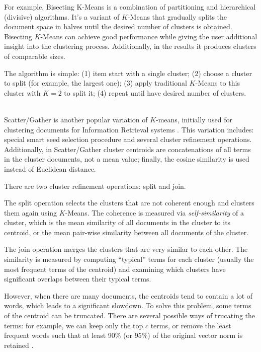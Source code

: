 For example, Bisecting K-Means \cite{steinbach2000comparison} is a combination
of partitioning and hierarchical (divisive) algorithms. It's a 
variant of $K$-Means that gradually splits the document space in halves 
until the desired number of clusters is obtained. Bisecting $K$-Means can 
achieve good performance while giving the user additional insight into 
the clustering process. Additionally, in the results it produces 
clusters of comparable sizes. 

The algorithm is simple: (1) item start with a single cluster;
(2) choose a cluster to split (for example, the largest one);
(3) apply traditional $K$-Means to this cluster with $K=2$ to split it;
(4) repeat until have desired number of clusters.

\ \\

Scatter/Gather is another popular variation of $K$-means, initially used for 
clustering documents for Information Retrieval systems \cite{cutting1992scatter}. 
This variation includes: special smart seed selection procedure and
several cluster refinement operations. Additionally, in Scatter/Gather 
cluster centroids are concatenations of all terms in the cluster documents, 
not a mean value; finally, the cosine similarity is used instead of Euclidean
distance.

There are two cluster refinement operations: split and join.

The split operation selects the clusters that are not coherent
enough and clusters them again using $K$-Means. The coherence is 
measured via \emph{self-similarity} of a cluster,
which is the mean similarity of all documents in the cluster to
its centroid, or the mean pair-wise similarity between all documents
of the cluster.

The join operation merges the clusters that are very similar
to each other. The similarity is measured by computing ``typical''
terms for each cluster (usually the most frequent terms of
the centroid) and examining which clusters have significant
overlaps between their typical terms.


However, when there are many documents, the centroids tend
to contain a lot of words, which leads to a significant slowdown.
To solve this problem, some terms of the centroid can be truncated. 
There are several possible ways of trucating the terms: for example, 
we can keep only the top $c$ terms, or remove the least frequent words 
such that at least 90\% (or 95\%) of the original vector norm is 
retained \cite{schutze1997projections}.


